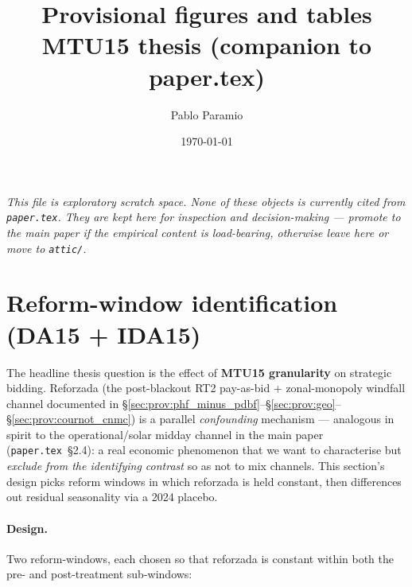 \documentclass[11pt,a4paper]{article}
\title{Provisional figures and tables\\[3pt]\large MTU15 thesis (companion to paper.tex)}
\author{Pablo Paramio}
\date{\today}
\newcommand{\code}[1]{\nolinkurl{#1}}
\begin{document}
\maketitle

\noindent\emph{This file is exploratory scratch space. None of these objects is currently cited from \texttt{paper.tex}. They are kept here for inspection and decision-making — promote to the main paper if the empirical content is load-bearing, otherwise leave here or move to \code{attic/}.}

\tableofcontents


\section{Reform-window identification (DA15 + IDA15)}\label{sec:prov:reform_window_ddd}

\noindent The headline thesis question is the effect of \textbf{MTU15 granularity} on strategic bidding. Reforzada (the post-blackout RT2 pay-as-bid + zonal-monopoly windfall channel documented in \S\ref{sec:prov:phf_minus_pdbf}--\S\ref{sec:prov:geo}--\S\ref{sec:prov:cournot_cnmc}) is a parallel \emph{confounding} mechanism --- analogous in spirit to the operational/solar midday channel in the main paper (\texttt{paper.tex}~§2.4): a real economic phenomenon that we want to characterise but \emph{exclude from the identifying contrast} so as not to mix channels. This section's design picks reform windows in which reforzada is held constant, then differences out residual seasonality via a 2024 placebo.

\paragraph{Design.} Two reform-windows, each chosen so that reforzada is constant within both the pre- and post-treatment sub-windows:
\end{document}
